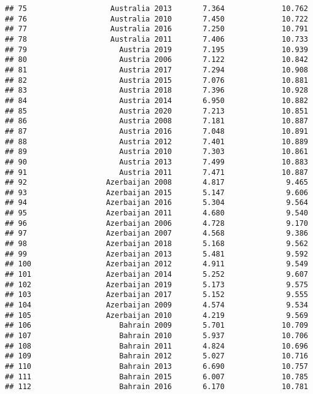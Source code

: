 \documentclass[
]{article}
\begin{document}
\begin{verbatim}
## 75                   Australia 2013       7.364             10.762
## 76                   Australia 2010       7.450             10.722
## 77                   Australia 2016       7.250             10.791
## 78                   Australia 2011       7.406             10.733
## 79                     Austria 2019       7.195             10.939
## 80                     Austria 2006       7.122             10.842
## 81                     Austria 2017       7.294             10.908
## 82                     Austria 2015       7.076             10.881
## 83                     Austria 2018       7.396             10.928
## 84                     Austria 2014       6.950             10.882
## 85                     Austria 2020       7.213             10.851
## 86                     Austria 2008       7.181             10.887
## 87                     Austria 2016       7.048             10.891
## 88                     Austria 2012       7.401             10.889
## 89                     Austria 2010       7.303             10.861
## 90                     Austria 2013       7.499             10.883
## 91                     Austria 2011       7.471             10.887
## 92                  Azerbaijan 2008       4.817              9.465
## 93                  Azerbaijan 2015       5.147              9.606
## 94                  Azerbaijan 2016       5.304              9.564
## 95                  Azerbaijan 2011       4.680              9.540
## 96                  Azerbaijan 2006       4.728              9.170
## 97                  Azerbaijan 2007       4.568              9.386
## 98                  Azerbaijan 2018       5.168              9.562
## 99                  Azerbaijan 2013       5.481              9.592
## 100                 Azerbaijan 2012       4.911              9.549
## 101                 Azerbaijan 2014       5.252              9.607
## 102                 Azerbaijan 2019       5.173              9.575
## 103                 Azerbaijan 2017       5.152              9.555
## 104                 Azerbaijan 2009       4.574              9.534
## 105                 Azerbaijan 2010       4.219              9.569
## 106                    Bahrain 2009       5.701             10.709
## 107                    Bahrain 2010       5.937             10.706
## 108                    Bahrain 2011       4.824             10.696
## 109                    Bahrain 2012       5.027             10.716
## 110                    Bahrain 2013       6.690             10.757
## 111                    Bahrain 2015       6.007             10.785
## 112                    Bahrain 2016       6.170             10.781

\end{verbatim}
\end{document}
